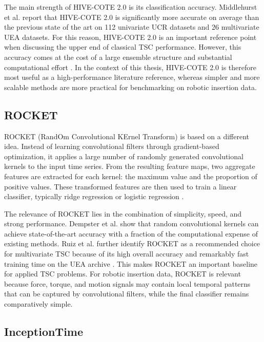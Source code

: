 The main strength of HIVE-COTE 2.0 is its classification accuracy. Middlehurst et al. report that HIVE-COTE 2.0 is significantly more accurate on average than the previous state of the art on 112 univariate UCR datasets and 26 multivariate UEA datasets. For this reason, HIVE-COTE 2.0 is an important reference point when discussing the upper end of classical TSC performance. However, this accuracy comes at the cost of a large ensemble structure and substantial computational effort \cite{middlehurstHIVECOTE20New2021,dempsterROCKETExceptionallyFast2020}. In the context of this thesis, HIVE-COTE 2.0 is therefore most useful as a high-performance literature reference, whereas simpler and more scalable methods are more practical for benchmarking on robotic insertion data.

\subsection{ROCKET \cite{dempsterROCKETExceptionallyFast2020}}

ROCKET (RandOm Convolutional KErnel Transform) is based on a different idea. Instead of learning convolutional filters through gradient-based optimization, it applies a large number of randomly generated convolutional kernels to the input time series. From the resulting feature maps, two aggregate features are extracted for each kernel: the maximum value and the proportion of positive values. These transformed features are then used to train a linear classifier, typically ridge regression or logistic regression \cite{dempsterROCKETExceptionallyFast2020,ruizGreatMultivariateTime2021}.

The relevance of ROCKET lies in the combination of simplicity, speed, and strong performance. Dempster et al. show that random convolutional kernels can achieve state-of-the-art accuracy with a fraction of the computational expense of existing methods. Ruiz et al. further identify ROCKET as a recommended choice for multivariate TSC because of its high overall accuracy and remarkably fast training time on the UEA archive \cite{ruizGreatMultivariateTime2021}. This makes ROCKET an important baseline for applied TSC problems. For robotic insertion data, ROCKET is relevant because force, torque, and motion signals may contain local temporal patterns that can be captured by convolutional filters, while the final classifier remains comparatively simple.

\subsection{InceptionTime \cite{ismailfawazInceptionTimeFindingAlexNet2020}}

